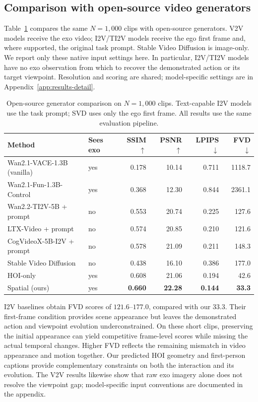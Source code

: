 \documentclass{article} %
\begin{document}
\subsection{Comparison with open-source video generators}
\label{sec:opensource-baselines}

Table~\ref{tab:opensource-baselines} compares the same $N{=}1{,}000$ clips
with open-source generators. V2V models receive the exo video; I2V/TI2V
models receive the ego first frame and, where supported, the original task
prompt. Stable Video Diffusion is image-only. We report only these native
input settings here. In particular, I2V/TI2V models have no exo observation
from which to recover the demonstrated action or its target viewpoint.
Resolution and scoring are shared; model-specific settings are in
Appendix~\ref{app:results-detail}.

\begin{table}[h]
\centering
\footnotesize
\caption{Open-source generator comparison on $N{=}1{,}000$ clips.
Text-capable I2V models use the task prompt; SVD uses only the ego first
frame. All results use the same evaluation pipeline.}
\label{tab:opensource-baselines}
\begin{tabular}{llrrrr}
\toprule
Method & Sees exo & SSIM $\uparrow$ & PSNR $\uparrow$ & LPIPS $\downarrow$ & FVD $\downarrow$ \\
\midrule
Wan2.1-VACE-1.3B (vanilla) & yes & 0.178 & 10.14 & 0.711 & 1118.7 \\
Wan2.1-Fun-1.3B-Control & yes & 0.368 & 12.30 & 0.844 & 2361.1 \\
\midrule
Wan2.2-TI2V-5B + prompt & no & 0.553 & 20.74 & 0.225 & 127.6 \\
LTX-Video + prompt & no & 0.574 & 20.85 & 0.210 & 121.6 \\
CogVideoX-5B-I2V + prompt & no & 0.578 & 21.09 & 0.211 & 148.3 \\
Stable Video Diffusion & no & 0.438 & 16.10 & 0.386 & 177.0 \\
\midrule
HOI-only & yes & 0.608 & 21.06 & 0.194 & 42.6 \\
Spatial (ours) & yes & \textbf{0.660} & \textbf{22.28} & \textbf{0.144} & \textbf{33.3} \\
\bottomrule
\end{tabular}
\end{table}

I2V baselines obtain FVD scores of $121.6$--$177.0$, compared with our
$33.3$. Their first-frame condition provides scene appearance but leaves
the demonstrated action and viewpoint evolution underconstrained. On these
short clips, preserving the initial appearance can yield competitive
frame-level scores while missing the actual temporal changes. Higher FVD
reflects the remaining mismatch in video appearance and motion together.
Our predicted HOI geometry and first-person captions provide complementary
constraints on both the interaction and its evolution. The V2V results
likewise show that raw exo imagery alone does not resolve the viewpoint gap;
model-specific input conventions are documented in the appendix.
\end{document}
